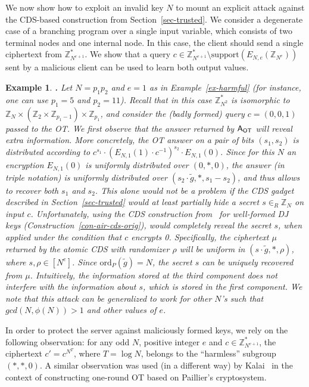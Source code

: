 \documentclass{article}
\newcommand{\order}{{\mathrm{ord}}}
\newcommand{\ansot}{{\sf A_{OT}}}
\newcommand{\encr}[2]{E_{#1}(#2)}
\newcommand{\encdj}{{E}_{N,e}}
\newcommand{\support}{{\mathrm{support}}}
\newcommand{\Z}{{\mathbb{Z}}}
\newtheorem{EXAMPLE}{Example}[section]
\newenvironment{example}{\begin{EXAMPLE} \hspace{-.85em} {\bf .} \rm}%
	{\end{EXAMPLE}}
\newcommand{\ot}{\mbox{OT}\;}
\newcommand{\otns}{\mbox{OT}}
\newcommand{\U}[1]{\mathbb{Z}_{#1}^*}
\begin{document}
We now show how to exploit an invalid key $N$ to mount an explicit
attack against the CDS-based construction from
Section~\ref{sec-trusted}.
We consider a degenerate case of a branching program over a single
input variable, which consists of two terminal nodes and one
internal node. In this case, the client should send a single
ciphertext from $\U{N^{e+1}}$. We show that a query
$c\in\U{N^{e+1}}\setminus\support(\encdj(\Z_{N^e}))$ sent by a
malicious client can be used to learn both output values.
\begin{example}
\label{ex-fullymal-attack} Let $N=p_1p_2$ and $e=1$ as in
Example~\ref{ex-harmful} (for instance, one can use $p_1=5$ and
$p_2=11$). Recall that in this case $\U{N^2}$ is isomorphic to
$\Z_N\times (\Z_2\times\Z_{p_1-1})\times \Z_{p_1}$, and consider
the (badly formed) query $c=(0,0,1)$ passed to the \otns. We first
observe that the answer returned by $\ansot$ will reveal extra
information. More concretely, the OT answer on a pair of bits
$(s_1,s_2)$ is distributed according to
$c^{s_1}\cdot(\encr{N,1}{1}\cdot c^{-1})^{s_2}\cdot \encr{N,1}{0}$.
Since for this $N$ an encryption $\encr{N,1}{0}$ is uniformly
distributed over $(0,*,0)$, the answer (in triple notation) is
uniformly distributed over $(s_2\cdot \tilde{g},*,s_1-s_2)$, and
thus allows to recover both $s_1$ and $s_2$. This alone would not be
a problem if the CDS gadget described in Section~\ref{sec-trusted}
would at least partially hide a secret $s\in_R\Z_N$ on input $c$. Unfortunately, using the CDS
construction from~\cite{AIR01} for well-formed DJ keys (Construction~\ref{con-air-cds-orig}),
would completely reveal the secret $s$, when applied under
the condition that $c$ encrypts 0. Specifically, the ciphertext
$\mu$ returned by the atomic CDS with randomizer $\rho$ will be
uniform in $(s\cdot \tilde{g},*,\rho)$, where $s,\rho\in[N^e]$.
Since $\order_P(\tilde{g})=N$,  the secret $s$ can be uniquely
recovered from $\mu$. Intuitively, the information stored at the
third component does not interfere with the information about $s$, which is stored in the first component. We note that this attack can be generalized to work for
other $N$'s such that $gcd(N,\phi(N))>1$ and other values of $e$.
\end{example}

In order to protect the server against maliciously formed keys, we
rely on the following observation: for any odd $N$, positive
integer $e$ and $c\in \U{N^{e+1}}$, the ciphertext $c'=c^{N^T}$,
where $T=\log N$, belongs to the ``harmless'' subgroup $(*,*,0)$. A
similar observation was used (in a different way) by
Kalai~\cite{T05} in the context of constructing one-round OT based
on Paillier's cryptosystem.
\end{document}
